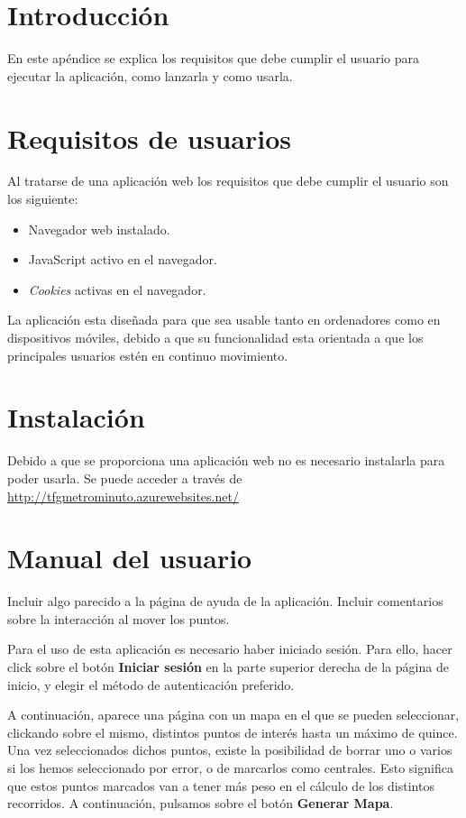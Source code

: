 
\section{Introducción}
En este apéndice se explica los requisitos que debe cumplir el usuario para ejecutar la aplicación, como lanzarla y como usarla.

\section{Requisitos de usuarios}
Al tratarse de una aplicación web los requisitos que debe cumplir el usuario son los siguiente:
\begin{itemize}
	\item Navegador web instalado.
	\item JavaScript activo en el navegador.
	\item \textit{Cookies} activas en el navegador.
\end{itemize}

La aplicación esta diseñada para que sea usable tanto en ordenadores como en dispositivos móviles, debido a que su funcionalidad esta orientada a que los principales usuarios estén en continuo movimiento.

\section{Instalación}
Debido a que se proporciona una aplicación web no es necesario instalarla para poder usarla. Se puede acceder a través de \url{http://tfgmetrominuto.azurewebsites.net/}

\section{Manual del usuario}
Incluir algo parecido a la página de ayuda de la aplicación.
Incluir comentarios sobre la interacción al mover los puntos.

Para el uso de esta aplicación es necesario haber iniciado sesión. Para ello, hacer click sobre el botón \textbf{Iniciar sesión} en la parte superior derecha de la página de inicio, y elegir el método de autenticación preferido.


A continuación, aparece una página con un mapa en el que se pueden seleccionar, clickando sobre el mismo, distintos puntos de interés hasta un máximo de quince. Una vez seleccionados dichos puntos, existe la posibilidad de borrar uno o varios si los hemos seleccionado por error, o de marcarlos como centrales. Esto significa que estos puntos marcados van a tener más peso en el cálculo de los distintos recorridos. A continuación, pulsamos sobre el botón \textbf{Generar Mapa}.


